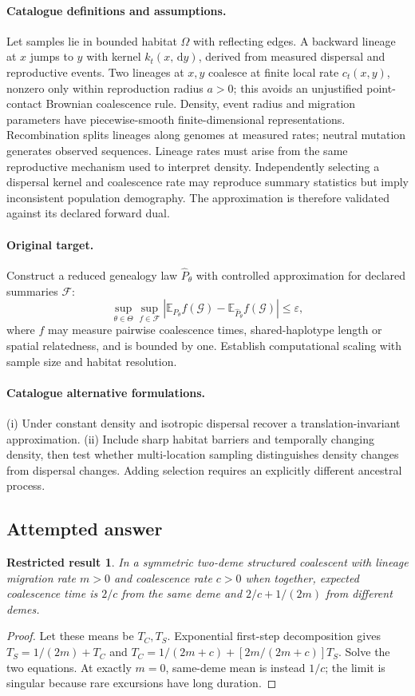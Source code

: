 \documentclass[11pt]{article}
\newcommand{\E}{\mathbb E}
\newcommand{\dd}{\,\mathrm d}
\providecommand{\E}{\mathbb E}
\newtheorem{attemptresult}{Restricted result}[section]
\begin{document}
\paragraph{Catalogue definitions and assumptions.}
Let samples lie in bounded habitat $\Omega$ with reflecting edges. A backward lineage at $x$ jumps to $y$ with kernel $k_t(x,\dd y)$, derived from measured dispersal and reproductive events. Two lineages at $x,y$ coalesce at finite local rate $c_t(x,y)$, nonzero only within reproduction radius $a>0$; this avoids an unjustified point-contact Brownian coalescence rule. Density, event radius and migration parameters have piecewise-smooth finite-dimensional representations. Recombination splits lineages along genomes at measured rates; neutral mutation generates observed sequences. Lineage rates must arise from the same reproductive mechanism used to interpret density. Independently selecting a dispersal kernel and coalescence rate may reproduce summary statistics but imply inconsistent population demography. The approximation is therefore validated against its declared forward dual.
\paragraph{Original target.}
Construct a reduced genealogy law $\widehat P_\theta$ with controlled approximation for declared summaries $\mathcal F$:
\[
 \sup_{\theta\in\Theta}\sup_{f\in\mathcal F}
 |\E_{P_\theta}f(\mathcal G)-\E_{\widehat P_\theta}f(\mathcal G)|
 \le\varepsilon,
\]
where $f$ may measure pairwise coalescence times, shared-haplotype length or spatial relatedness, and is bounded by one. Establish computational scaling with sample size and habitat resolution.
\paragraph{Catalogue alternative formulations.}
(i) Under constant density and isotropic dispersal recover a translation-invariant approximation. (ii) Include sharp habitat barriers and temporally changing density, then test whether multi-location sampling distinguishes density changes from dispersal changes. Adding selection requires an explicitly different ancestral process.
\subsection{Attempted answer}
\begin{attemptresult}
In a symmetric two-deme structured coalescent with lineage migration rate $m>0$ and coalescence rate $c>0$ when together, expected coalescence time is $2/c$ from the same deme and $2/c+1/(2m)$ from different demes.
\end{attemptresult}
\begin{proof}
Let these means be $T_C,T_S$. Exponential first-step decomposition gives $T_S=1/(2m)+T_C$ and $T_C=1/(2m+c)+[2m/(2m+c)]T_S$. Solve the two equations. At exactly $m=0$, same-deme mean is instead $1/c$; the limit is singular because rare excursions have long duration.
\end{proof}
\end{document}
